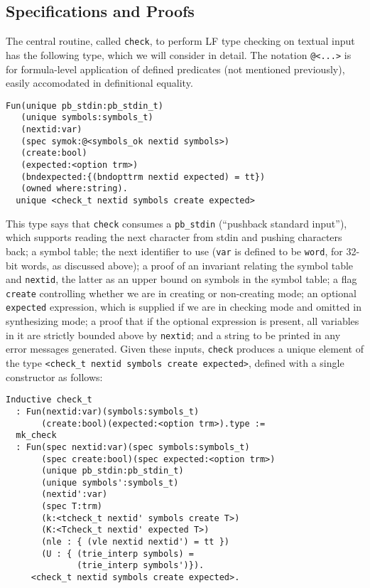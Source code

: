 \documentclass[preprint,natbib]{sigplanconf}
\begin{document}
\subsection{Specifications and Proofs}

The central routine, called \texttt{check}, to perform LF type
checking on textual input has the following type, which we will
consider in detail.  The notation \texttt{@<...>} is for formula-level
application of defined predicates (not mentioned previously), easily
accomodated in definitional equality.

\begin{verbatim}
Fun(unique pb_stdin:pb_stdin_t)
   (unique symbols:symbols_t)
   (nextid:var)
   (spec symok:@<symbols_ok nextid symbols>)
   (create:bool)
   (expected:<option trm>)
   (bndexpected:{(bndopttrm nextid expected) = tt})
   (owned where:string).
  unique <check_t nextid symbols create expected>
\end{verbatim}

\noindent This type says that \texttt{check} consumes a
\texttt{pb\_stdin} (``pushback standard input''), which supports
reading the next character from stdin and pushing characters back; a
symbol table; the next identifier to use (\texttt{var} is defined to
be \texttt{word}, for 32-bit words, as discussed above); a proof of an
invariant relating the symbol table and \texttt{nextid}, the latter as
an upper bound on symbols in the symbol table; a flag \texttt{create}
controlling whether we are in creating or non-creating mode; an
optional \texttt{expected} expression, which is supplied if we are in
checking mode and omitted in synthesizing mode; a proof that if the
optional expression is present, all variables in it are strictly
bounded above by \texttt{nextid}; and a string to be printed in any
error messages generated.  Given these inputs, \texttt{check} produces
a unique element of the type \texttt{<check\_t nextid symbols create
expected>}, defined with a single constructor as follows:

\begin{verbatim}
Inductive check_t
  : Fun(nextid:var)(symbols:symbols_t)
       (create:bool)(expected:<option trm>).type :=
  mk_check 
  : Fun(spec nextid:var)(spec symbols:symbols_t)
       (spec create:bool)(spec expected:<option trm>)
       (unique pb_stdin:pb_stdin_t)
       (unique symbols':symbols_t)
       (nextid':var)
       (spec T:trm)
       (k:<tcheck_t nextid' symbols create T>)
       (K:<Tcheck_t nextid' expected T>)
       (nle : { (vle nextid nextid') = tt })
       (U : { (trie_interp symbols) = 
              (trie_interp symbols')}).
     <check_t nextid symbols create expected>.
\end{verbatim}
\end{document}
